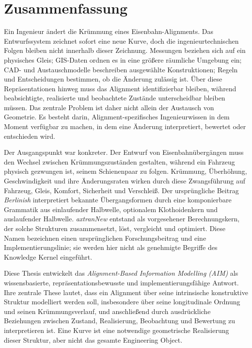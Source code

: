 
\cleardoublepage
\chapter*{Zusammenfassung}
{}

Ein Ingenieur ändert die Krümmung eines Eisenbahn-Alignments. Das
Entwurfssystem zeichnet sofort eine neue Kurve, doch die ingenieurtechnischen
Folgen bleiben nicht innerhalb dieser Zeichnung. Messungen beziehen sich auf
ein physisches Gleis; GIS-Daten ordnen es in eine größere räumliche Umgebung
ein; CAD- und Austauschmodelle beschreiben ausgewählte Konstruktionen; Regeln
und Entscheidungen bestimmen, ob die Änderung zulässig ist. Über diese
Repräsentationen hinweg muss das Alignment identifizierbar bleiben, während
beabsichtigte, realisierte und beobachtete Zustände unterscheidbar bleiben
müssen. Das zentrale Problem ist daher nicht allein der Austausch von
Geometrie. Es besteht darin, Alignment-spezifisches Ingenieurwissen in dem
Moment verfügbar zu machen, in dem eine Änderung interpretiert, bewertet oder
entschieden wird.

Der Ausgangspunkt war konkreter. Der Entwurf von Eisenbahnübergängen muss den
Wechsel zwischen Krümmungszuständen gestalten, während ein Fahrzeug physisch
gezwungen ist, seinem Schienenpaar zu folgen. Krümmung, Überhöhung,
Geschwindigkeit und ihre Änderungsraten wirken durch diese Zwangsführung auf
Fahrzeug, Gleis, Komfort, Sicherheit und Verschleiß. Der ursprüngliche Beitrag
\emph{Berlinish} interpretiert bekannte Übergangsformen durch eine
komponierbare Grammatik aus einlaufender Halbwelle, optionalem Klothoidenkern
und auslaufender Halbwelle. \emph{axtranNew} entstand als vorgesehener
Berechnungskern, der solche Strukturen zusammensetzt, löst, vergleicht und
optimiert. Diese Namen bezeichnen einen ursprünglichen Forschungsbeitrag und
eine Implementierungslinie; sie werden hier nicht als genehmigte Begriffe des
Knowledge Kernel eingeführt.

Diese Thesis entwickelt das \emph{Alignment-Based Information Modelling
(AIM)} als wissensbasierte, repräsentationsbewusste und
implementierungsfähige Antwort. Ihre zentrale These lautet, dass ein Alignment
über seine intrinsische konstruktive Struktur modelliert werden soll,
insbesondere über seine longitudinale Ordnung und seinen Krümmungsverlauf, und
anschließend durch ausdrückliche Beziehungen zwischen Zustand, Realisierung,
Beobachtung und Bewertung zu interpretieren ist. Eine Kurve ist eine
notwendige geometrische Realisierung dieser Struktur, aber nicht das gesamte
Engineering Object.

